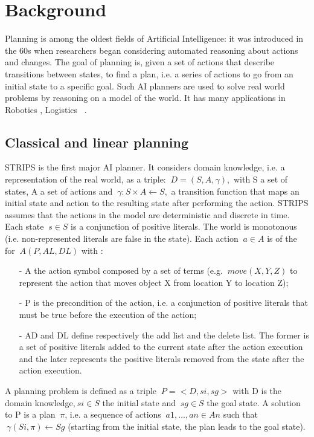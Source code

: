 \chapter{Background} %

\label{Chapter 2} %

\par Planning is among the oldest fields of Artificial Intelligence: it was introduced in the 60s when researchers began considering automated reasoning about actions and changes. The goal of planning is, given a set of actions that describe transitions
between states, to find a plan, i.e. a series of actions to go from an initial state to a specific goal. Such AI planners are used to solve real world problems by reasoning
on a model of the world. It has many applications in Robotics \cite{shin1986dynamic}, Logistics ~\cite{crainic2009models}.
\section{Classical and linear planning}
STRIPS \cite{fikes1972strips} is the first major AI planner. It considers domain knowledge, i.e. a representation of the real world, as a triple: $\ D = (S,A,\gamma), $ with S a set of states, A a set of actions and $\ \gamma: S \times A  \leftarrow S,$ a transition function that maps an initial state and action to the resulting state after performing the action. STRIPS assumes that the actions in the model are deterministic and discrete in time. Each state $\ s \in S $ is a conjunction of positive literals. The world is monotonous (i.e. non-represented literals are false in the state). Each action $\ a \in A $ is of the for $\ A (P, AL, DL) $ with : 
\begin{itemize}
	\item[-] A the action symbol composed by a set of terms (e.g. $\ move(X,Y,Z) $ to represent the action that moves object X from location Y to location Z);
	\item[-] P is the precondition of the action, i.e. a conjunction of positive literals that must be true before the execution of the action;
	\item[-] AD and DL define respectively the add list and the delete list. The former is 	a set of positive literals added to the current state after the action execution 	and the later represents the positive literals removed from the state after the action execution.
\end{itemize}
\par A planning problem is defined as a triple $\ P = <D, si, sg> $ with D is the domain knowledge,$\ si \in S $ the initial state and $\ sg \in S $ the goal state. A solution to P is a plan $\ \pi $, i.e. a sequence of actions $\ a1,..., an \in An $ such that $\ \gamma (Si, \pi) \leftarrow Sg $ (starting from the initial state, the plan leads to the goal state).


